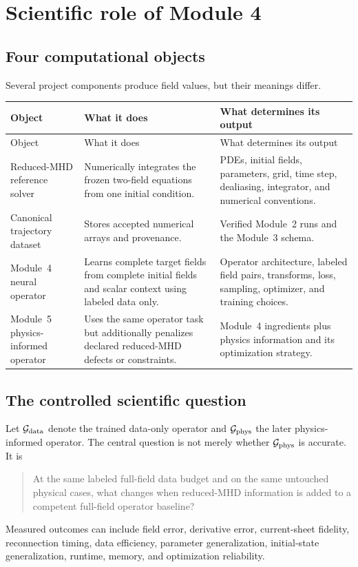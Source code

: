 \documentclass[11pt]{article}
\begin{document}
\ProjectTOC
\clearpage
{}

\section{Scientific role of Module 4}
\label{sec:role}

\subsection{Four computational objects}
Several project components produce field values, but their meanings differ.

\begin{longtable}{p{}p{}p{}}
\toprule
Object & What it does & What determines its output \\
\midrule
\endfirsthead
\toprule
Object & What it does & What determines its output \\
\midrule
\endhead
Reduced-MHD reference solver & Numerically integrates the frozen two-field equations from one initial condition. & PDEs, initial fields, parameters, grid, time step, dealiasing, integrator, and numerical conventions. \\
Canonical trajectory dataset & Stores accepted numerical arrays and provenance. & Verified Module~2 runs and the Module~3 schema. \\
Module~4 neural operator & Learns complete target fields from complete initial fields and scalar context using labeled data only. & Operator architecture, labeled field pairs, transforms, loss, sampling, optimizer, and training choices. \\
Module~5 physics-informed operator & Uses the same operator task but additionally penalizes declared reduced-MHD defects or constraints. & Module~4 ingredients plus physics information and its optimization strategy. \\
\bottomrule
\end{longtable}

\subsection{The controlled scientific question}
Let $\mathcal{G}_{\rm data}$ denote the trained data-only operator and $\mathcal{G}_{\rm phys}$ the later physics-informed operator. The central question is not merely whether $\mathcal{G}_{\rm phys}$ is accurate. It is
\begin{quote}
At the same labeled full-field data budget and on the same untouched physical cases, what changes when reduced-MHD information is added to a competent full-field operator baseline?
\end{quote}
Measured outcomes can include field error, derivative error, current-sheet fidelity, reconnection timing, data efficiency, parameter generalization, initial-state generalization, runtime, memory, and optimization reliability.
\end{document}
